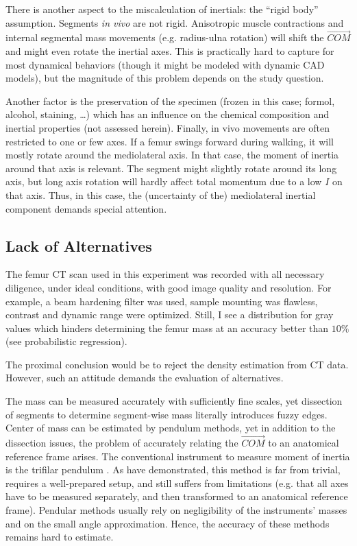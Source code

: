 There is another aspect to the miscalculation of inertials: the ``rigid body'' assumption.
Segments \emph{in vivo} are not rigid.
Anisotropic muscle contractions and internal segmental mass movements (e.g. radius-ulna rotation) will shift the \(\vec{COM}\) and might even rotate the inertial axes.
This is practically hard to capture for most dynamical behaviors (though it might be modeled with dynamic CAD models), but the magnitude of this problem depends on the study question.

Another factor is the preservation of the specimen (frozen in this case; formol, alcohol, staining, \ldots{}) which has an influence on the chemical composition and inertial properties (not assessed herein).
Finally, in vivo movements are often restricted to one or few axes.
If a femur swings forward during walking, it will mostly rotate around the mediolateral axis.
In that case, the moment of inertia around that axis is relevant.
The segment might slightly rotate around its long axis, but long axis rotation will hardly affect total momentum due to a low \(I\) on that axis.
Thus, in this case, the (uncertainty of the) mediolateral inertial component demands special attention.


\subsection{Lack of Alternatives}
\label{sec:org7354f43}
The femur CT scan used in this experiment was recorded with all necessary diligence, under ideal conditions, with good image quality and resolution.
For example, a beam hardening filter was used, sample mounting was flawless, contrast and dynamic range were optimized.
Still, I see a distribution for gray values which hinders determining the femur mass at an accuracy better than \(10 \%\) (see probabilistic regression).

The proximal conclusion would be to reject the density estimation from CT data.
However, such an attitude demands the evaluation of alternatives.



The mass can be measured accurately with sufficiently fine scales, yet dissection of segments to determine segment-wise mass literally introduces fuzzy edges.
Center of mass can be estimated by pendulum methods, yet in addition to the dissection issues, the problem of accurately relating the \(\vec{COM}\) to an anatomical reference frame arises.
The conventional instrument to measure moment of inertia is the trifilar pendulum \citep{Korr1962,Wells1987,Schedlinski2001}.
As \citet{Durston2022} have demonstrated, this method is far from trivial, requires a well-prepared setup, and still suffers from limitations (e.g. that all axes have to be measured separately, and then transformed to an anatomical reference frame).
Pendular methods usually rely on negligibility of the instruments' masses and on the small angle approximation.
Hence, the accuracy of these methods remains hard to estimate.


